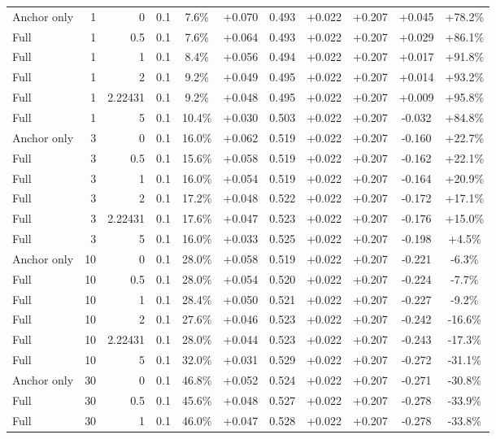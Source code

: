 \begin{table}[htbp]
\begin{tabular}{lrrrccccccc}
Anchor only & 1 & 0 & 0.1 & 7.6\% & +0.070 & 0.493 & +0.022 & +0.207 & +0.045 & +78.2\% \\
Full & 1 & 0.5 & 0.1 & 7.6\% & +0.064 & 0.493 & +0.022 & +0.207 & +0.029 & +86.1\% \\
Full & 1 & 1 & 0.1 & 8.4\% & +0.056 & 0.494 & +0.022 & +0.207 & +0.017 & +91.8\% \\
Full & 1 & 2 & 0.1 & 9.2\% & +0.049 & 0.495 & +0.022 & +0.207 & +0.014 & +93.2\% \\
Full & 1 & 2.22431 & 0.1 & 9.2\% & +0.048 & 0.495 & +0.022 & +0.207 & +0.009 & +95.8\% \\
Full & 1 & 5 & 0.1 & 10.4\% & +0.030 & 0.503 & +0.022 & +0.207 & -0.032 & +84.8\% \\
Anchor only & 3 & 0 & 0.1 & 16.0\% & +0.062 & 0.519 & +0.022 & +0.207 & -0.160 & +22.7\% \\
Full & 3 & 0.5 & 0.1 & 15.6\% & +0.058 & 0.519 & +0.022 & +0.207 & -0.162 & +22.1\% \\
Full & 3 & 1 & 0.1 & 16.0\% & +0.054 & 0.519 & +0.022 & +0.207 & -0.164 & +20.9\% \\
Full & 3 & 2 & 0.1 & 17.2\% & +0.048 & 0.522 & +0.022 & +0.207 & -0.172 & +17.1\% \\
Full & 3 & 2.22431 & 0.1 & 17.6\% & +0.047 & 0.523 & +0.022 & +0.207 & -0.176 & +15.0\% \\
Full & 3 & 5 & 0.1 & 16.0\% & +0.033 & 0.525 & +0.022 & +0.207 & -0.198 & +4.5\% \\
Anchor only & 10 & 0 & 0.1 & 28.0\% & +0.058 & 0.519 & +0.022 & +0.207 & -0.221 & -6.3\% \\
Full & 10 & 0.5 & 0.1 & 28.0\% & +0.054 & 0.520 & +0.022 & +0.207 & -0.224 & -7.7\% \\
Full & 10 & 1 & 0.1 & 28.4\% & +0.050 & 0.521 & +0.022 & +0.207 & -0.227 & -9.2\% \\
Full & 10 & 2 & 0.1 & 27.6\% & +0.046 & 0.523 & +0.022 & +0.207 & -0.242 & -16.6\% \\
Full & 10 & 2.22431 & 0.1 & 28.0\% & +0.044 & 0.523 & +0.022 & +0.207 & -0.243 & -17.3\% \\
Full & 10 & 5 & 0.1 & 32.0\% & +0.031 & 0.529 & +0.022 & +0.207 & -0.272 & -31.1\% \\
Anchor only & 30 & 0 & 0.1 & 46.8\% & +0.052 & 0.524 & +0.022 & +0.207 & -0.271 & -30.8\% \\
Full & 30 & 0.5 & 0.1 & 45.6\% & +0.048 & 0.527 & +0.022 & +0.207 & -0.278 & -33.9\% \\
Full & 30 & 1 & 0.1 & 46.0\% & +0.047 & 0.528 & +0.022 & +0.207 & -0.278 & -33.8\% \\

\end{tabular}
\end{table}
